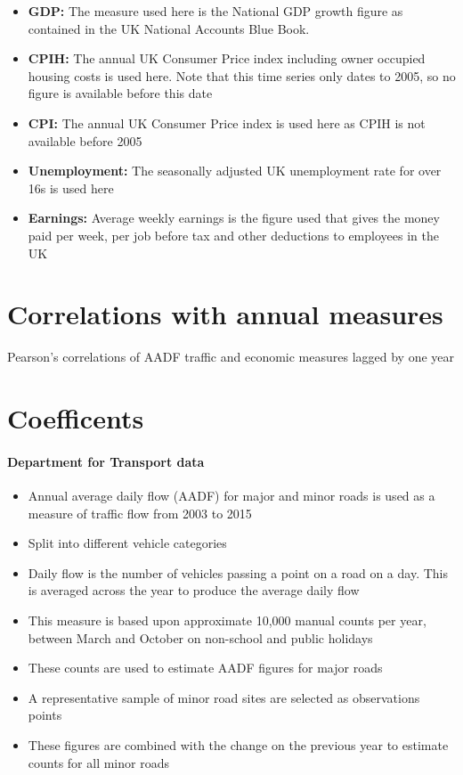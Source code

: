 \documentclass[11pt]{article}
\providecommand{\tightlist}{%
      \setlength{\itemsep}{0pt}\setlength{\parskip}{0pt}}
\begin{document}
\begin{itemize}
\tightlist
\item
  \textbf{GDP:} The measure used here is the National GDP growth figure
  as contained in the UK National Accounts Blue Book.
\item
  \textbf{CPIH:} The annual UK Consumer Price index including owner
  occupied housing costs is used here. Note that this time series only
  dates to 2005, so no figure is available before this date
\item
  \textbf{CPI:} The annual UK Consumer Price index is used here as CPIH
  is not available before 2005
\item
  \textbf{Unemployment:} The seasonally adjusted UK unemployment rate
  for over 16s is used here
\item
  \textbf{Earnings:} Average weekly earnings is the figure used that
  gives the money paid per week, per job before tax and other deductions
  to employees in the UK
\end{itemize}

    \section{Correlations with annual
measures}\label{correlations-with-annual-measures}

    Pearson's correlations of AADF traffic and economic measures lagged by
one year

    \section{Coefficents}\label{coefficents}

    \paragraph{Department for Transport
data}\label{department-for-transport-data}

\begin{itemize}
\tightlist
\item
  Annual average daily flow (AADF) for major and minor roads is used as
  a measure of traffic flow from 2003 to 2015
\item
  Split into different vehicle categories
\item
  Daily flow is the number of vehicles passing a point on a road on a
  day. This is averaged across the year to produce the average daily
  flow
\item
  This measure is based upon approximate 10,000 manual counts per year,
  between March and October on non-school and public holidays
\item
  These counts are used to estimate AADF figures for major roads
\item
  A representative sample of minor road sites are selected as
  observations points
\item
  These figures are combined with the change on the previous year to
  estimate counts for all minor roads
\end{itemize}
\end{document}
